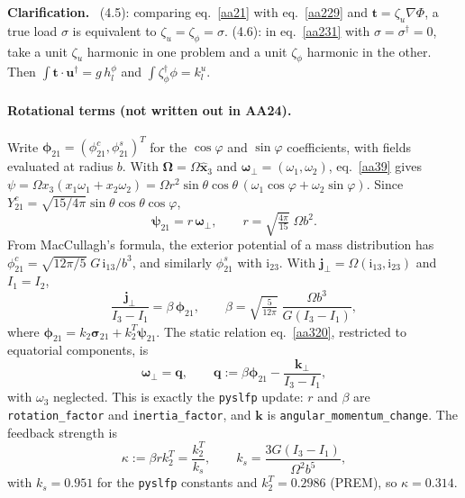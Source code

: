 \documentclass[11pt,a4paper]{article}
\newcommand{\bO}{\bm{\Omega}}
\newcommand{\bw}{\bm{\omega}}
\newcommand{\bu}{\mathbf{u}}
\newcommand{\bt}{\mathbf{t}}
\newcommand{\bj}{\mathbf{j}}
\newcommand{\bk}{\mathbf{k}}
\newcommand{\bq}{\mathbf{q}}
\renewenvironment{leftbar}{%
  \def\FrameCommand{{\color{clarbar}\vrule width 2.5pt}\hspace{8pt}}%
  \MakeFramed{\advance\hsize-\width\FrameRestore}}%
  {\endMakeFramed}
\newenvironment{clar}{\begin{leftbar}\small\noindent\textbf{Clarification.}\ }{\end{leftbar}}
\begin{document}
\begin{clar}
(4.5): comparing eq.~\eqref{aa21} with eq.~\eqref{aa229} and $\bt=\zeta_u\nabla\Phi$, a true load
$\sigma$ is equivalent to $\zeta_u=\zeta_\phi=\sigma$. (4.6): in eq.~\eqref{aa231} with
$\sigma=\sigma^\dagger=0$, take a unit $\zeta_u$ harmonic in one problem and a unit $\zeta_\phi$
harmonic in the other. Then $\int\bt\cdot\bu^\dagger=g\,h^\phi_l$ and
$\int\zeta^\dagger_\phi\phi=k^u_l$.
\end{clar}

\paragraph{Rotational terms (not written out in AA24).} Write $\bm{\phi}_{21}=(\phi^c_{21},\phi^s_{21})^T$
for the $\cos\varphi$ and $\sin\varphi$ coefficients, with fields evaluated at radius $b$. With
$\bO=\Omega\hat{\mathbf{x}}_3$ and $\bw_\perp=(\omega_1,\omega_2)$, eq.~\eqref{aa39} gives
$\psi=\Omega x_3(x_1\omega_1+x_2\omega_2)=\Omega r^2\sin\theta\cos\theta\,(\omega_1\cos\varphi+\omega_2\sin\varphi)$.
Since $Y^c_{21}=\sqrt{15/4\pi}\sin\theta\cos\theta\cos\varphi$,
\begin{equation}
  \bm{\psi}_{21}=r\,\bw_\perp,\qquad r=\sqrt{\tfrac{4\pi}{15}}\;\Omega b^2 .
  \tag{P1}\label{p1}
\end{equation}
From MacCullagh's formula, the exterior potential of a mass distribution has
$\phi^c_{21}=\sqrt{12\pi/5}\;G\,\mathrm{i}_{13}/b^3$, and similarly $\phi^s_{21}$ with
$\mathrm{i}_{23}$. With $\bj_\perp=\Omega(\mathrm{i}_{13},\mathrm{i}_{23})$ and $I_1=I_2$,
\begin{equation}
  \frac{\bj_\perp}{I_3-I_1}=\beta\,\bm{\phi}_{21},\qquad
  \beta=\sqrt{\tfrac{5}{12\pi}}\;\frac{\Omega b^3}{G(I_3-I_1)} ,
  \tag{P2}\label{p2}
\end{equation}
where $\bm\phi_{21}=k_2\bm\sigma_{21}+k_2^T\bm\psi_{21}$. The static relation eq.~\eqref{aa320},
restricted to equatorial components, is
\begin{equation}
  \bw_\perp=\bq,\qquad \bq:=\beta\bm\phi_{21}-\frac{\bk_\perp}{I_3-I_1},
  \tag{P3}\label{p3}
\end{equation}
with $\omega_3$ neglected. This is exactly the \texttt{pyslfp} update: $r$ and $\beta$ are
\texttt{rotation\_factor} and \texttt{inertia\_factor}, and $\bk$ is \texttt{angular\_momentum\_change}.
The feedback strength is
\begin{equation}
  \kappa:=\beta r k_2^T=\frac{k_2^T}{k_s},\qquad k_s=\frac{3G(I_3-I_1)}{\Omega^2b^5},
  \tag{P4}\label{p4}
\end{equation}
with $k_s=0.951$ for the \texttt{pyslfp} constants and $k_2^T=0.2986$ (PREM), so $\kappa=0.314$.
\end{document}
